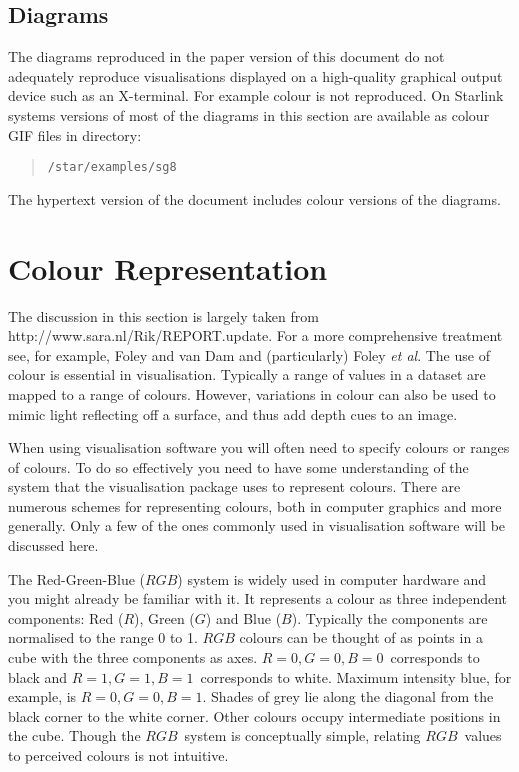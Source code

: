 \subsection{Diagrams}

The diagrams reproduced in the paper version of this document do not
adequately reproduce visualisations displayed on a high-quality
graphical output device such as an X-terminal. For example colour
is not reproduced. On Starlink systems versions of most of the
diagrams in this section are available as colour GIF files in directory:

\begin{quote}
{\tt /star/examples/sg8}
\end{quote}

The hypertext version of the document includes colour versions of the
diagrams.


\section{Colour Representation \label{COLREP}  }

The discussion in this section is largely taken from 
{http://www.sara.nl/Rik/REPORT.update}\cite{BELIEN}. For a more
comprehensive treatment see, for example, Foley and van Dam\cite{FOLEY1}
and (particularly) Foley {\it et al}\cite{FOLEY2}. The use of colour is
essential in visualisation. Typically a range of values in a dataset are
mapped to a range of colours. However, variations in colour can also be
used to mimic light reflecting off a surface, and thus add depth cues to
an image.

When using visualisation software you will often need to specify colours
or ranges of colours. To do so effectively you need to have some
understanding of the system that the visualisation package uses to
represent colours. There are numerous schemes for representing colours,
both in computer graphics and more generally. Only a few of the ones
commonly used in visualisation software will be discussed here.

The Red-Green-Blue ($RGB$) system is widely used in computer hardware
and you might already be familiar with it. It represents a colour
as three independent components: Red ($R$), Green ($G$) and Blue ($B$).
Typically the components are normalised to the range 0 to 1. $RGB$
colours can be thought of as points in a cube with the three components
as axes. $R=0, G=0, B=0$\, corresponds to black and $R=1, G=1, B=1$\,
corresponds to white. Maximum intensity blue, for example, is $R=0, G=0,
B=1$. Shades of grey lie along the diagonal from the black corner to the
white corner. Other colours occupy intermediate positions in the cube.
Though the $RGB$\, system is conceptually simple, relating $RGB$\,
values to perceived colours is not intuitive.

